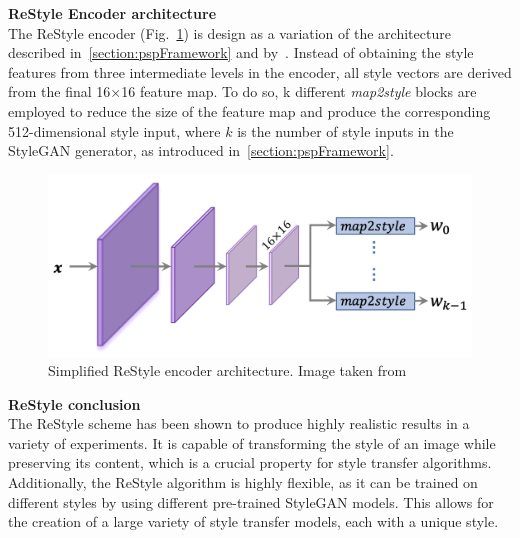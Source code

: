 \noindent \textbf{ReStyle Encoder architecture}\\
The ReStyle encoder (Fig.~\ref{fig:ReStyle encoder architecture}) is design as a variation of the architecture described in~\ref{section:pspFramework} and by~\cite{e4e}. Instead of obtaining the style features from three intermediate levels in the encoder, all style vectors are derived from the final 16×16 feature map. To do so, k different \textit{map2style} blocks are employed to reduce the size of the feature map and produce the corresponding 512-dimensional style input, where $k$ is the number of style inputs in the StyleGAN generator, as introduced in~\ref{section:pspFramework}.
 \begin{figure}[htbp]
\centering
  \includegraphics[scale=0.5]{figures/restyle-encoderArchitecture.png}
  \caption{Simplified ReStyle encoder architecture. Image taken from~\cite{alaluf2021restyle}}
  \label{fig:ReStyle encoder architecture}
\end{figure}


\noindent \textbf{ReStyle conclusion}\\
The ReStyle scheme has been shown to produce highly realistic results in a variety of experiments. It is capable of transforming the style of an image while preserving its content, which is a crucial property for style transfer algorithms. Additionally, the ReStyle algorithm is highly flexible, as it can be trained on different styles by using different pre-trained StyleGAN models. This allows for the creation of a large variety of style transfer models, each with a unique style.
